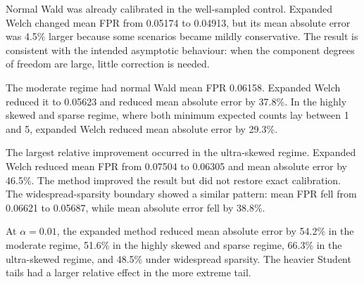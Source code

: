\begin{table}[htbp]
\centering
\caption{Calibration at \(\alpha=0.05\). Error change is the relative
reduction in mean absolute error from normal Wald to expanded Welch; a
negative value denotes deterioration.}
\label{tab:regime-calibration}
\small
{}
\end{table}

Normal Wald was already calibrated in the well-sampled control. Expanded
Welch changed mean FPR from 0.05174 to 0.04913, but its mean absolute error was
4.5\% larger because some scenarios became mildly conservative. The result is
consistent with the intended asymptotic behaviour: when the component degrees
of freedom are large, little correction is needed.

The moderate regime had normal Wald mean FPR 0.06158. Expanded Welch reduced
it to 0.05623 and reduced mean absolute error by 37.8\%. In the highly skewed
and sparse regime, where both minimum expected counts lay between 1 and 5,
expanded Welch reduced mean absolute error by 29.3\%.

The largest relative improvement occurred in the ultra-skewed regime. Expanded
Welch reduced mean FPR from 0.07504 to 0.06305 and mean absolute error by
46.5\%. The method improved the result but did not restore exact calibration.
The widespread-sparsity boundary showed a similar pattern: mean FPR fell from
0.06621 to 0.05687, while mean absolute error fell by 38.8\%.

At \(\alpha=0.01\), the expanded method reduced mean absolute error by 54.2\%
in the moderate regime, 51.6\% in the highly skewed and sparse regime, 66.3\%
in the ultra-skewed regime, and 48.5\% under widespread sparsity. The heavier
Student tails had a larger relative effect in the more extreme tail.

